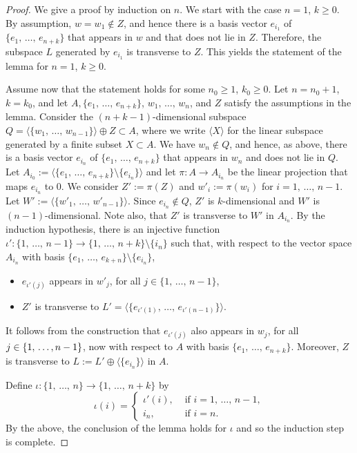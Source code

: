 \documentclass[AHL,Unicode,longabstracts,published]{cedram}
\begin{document}
\begin{proof}
We give a proof by induction on $n$. We start with the case $n=1$, $k\geq 0$. By assumption, $w=w_1 \notin Z$, and hence there is a basis vector $e_{i_1}$ of $\{e_1,\, \ldots,\, e_{n+k}\}$ that appears in $w$ and that does not lie in $Z$. Therefore, the subspace $L$ generated by $e_{i_1}$ is transverse to $Z$. This yields the statement of the lemma for $n=1$, $k\geq 0$.

Assume now that the statement holds for some $n_0\geq 1$, $k_0\geq 0$. Let $n=n_0 +1$, $k=k_0$, and let $A, \{e_1, \,\ldots,\, e_{n+k}\}$, $w_1, \,\ldots,\, w_{n}$, and $Z$ satisfy the assumptions in the lemma. Consider the $(n+k-1)$-dimensional subspace $Q = \langle\{ w_1,\,\ldots,\,w_{n-1}\}\rangle \oplus Z \subset A$, where we write $\langle X \rangle$ for the linear subspace generated by a finite subset $X \subset A$. We have $w_n \notin Q$, and hence, as above, there is a basis vector $e_{i_n}$ of $\{e_1,\,\ldots,\,e_{n+k}\}$ that appears in $w_n$ and does not lie in $Q$. Let $A_{i_0} := \langle \{e_1,\,\ldots, \,e_{n+k}\} \setminus \{e_{i_n}\} \rangle$ and let $\pi:A \to A_{i_n}$ be the linear projection that maps $e_{i_n}$ to $0$. We consider $Z':= \pi(Z)$ and $w'_i := \pi(w_i)$ for $i=1,\,\ldots,\,n-1$. Let $W':= \langle\{ w'_1,\,\ldots,\,w'_{n-1}\}\rangle$. Since $e_{i_n}\notin Q$, $Z'$ is $k$-dimensional and $W'$ is $(n-1)$-dimensional. Note also, that $Z'$ is transverse to $W'$ in $A_{i_n}$. By the induction hypothesis, there is an injective function $\iota':\{1,\,\ldots,\,{n-1}\} \to \{1,\,\ldots,\,n+k\}\setminus\{i_n\}$ such that, with respect to the vector space $A_{i_n}$ with basis $ \{e_1,\,\ldots,\,e_{k+n}\} \setminus \{e_{i_n} \}$,
\begin{itemize}
\item $e_{\iota'(j)}$ appears in $w'_j$, for all $j\in \{1, \,\ldots,\, n-1\}$,
\item $Z'$ is transverse to $L'= \langle \{e_{\iota'(1)}, \,\ldots,\, e_{\iota'(n-1)}\}\rangle$.
\end{itemize}



It follows from the construction that $e_{\iota'(j)}$ also appears in $w_j$, for all $j\in \{1,\, \ldots,\linebreak n-1\}$, now with respect to $A$ with basis $\{e_1,\, \ldots,\, e_{n+k}\}$. Moreover, $Z$ is transverse to $L := L' \oplus \langle \{e_{i_n}\}\rangle$ in $A$.


Define $\iota:\{1,\, \ldots,\, n\} \to \{1,\, \ldots,\, n+k\}$ by
\[
\iota(i) =
\begin{cases} \iota'(i), &\text{ if } i = 1,\, \ldots,\, n-1, \\
i_n, & \text{ if } i=n.
\end{cases}
\]
By the above, the conclusion of the lemma holds for $\iota$ and so the induction step is complete.
\end{proof}
\end{document}
